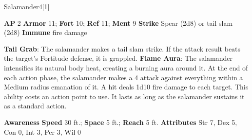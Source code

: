 \begin{monsection}[Flamebrother]{Salamander}{4}[1]
\vspace{-1em}\vspace{-1em}
\begin{spellcontent}
\begin{spelltargetinginfo}
{\textbf{AP} 2}
\pari \textbf{Armor} 11;
\textbf{Fort} 10;
\textbf{Ref} 11;
\textbf{Ment} 9
\pari \textbf{Strike} Spear  (2d8) or tail slam  (2d8)
\pari \textbf{Immune} fire damage
\end{spelltargetinginfo}
\begin{spelleffects}
\pari
\textbf{Tail Grab}:
The salamander makes a tail slam strike.
If the attack result beats the target's Fortitude defense, it is grappled.
\vspace{0.5em}
\pari
\textbf{Flame Aura}:
The salamander intensifies its natural body heat, creating a burning aura around it.
At the end of each action phase, the salamander makes a 4 attack
against everything within a Medium radius emanation of it.
A hit deals 1d10 fire damage to each target.
This ability costs an action point to use.
It lasts as long as the salamander sustains it as a standard action.
\end{spelleffects}
\end{spellcontent}
\begin{spellsubcontent}
\begin{spellfooter}
\pari \textbf{Awareness} 
\pari \textbf{Speed} 30 ft.;
\textbf{Space} 5 ft.;
\textbf{Reach} 5 ft.
\pari \textbf{Attributes}
Str 7,
Dex 5,
Con 0,
Int 3,
Per 3,
Wil 0
\end{spellfooter}
\end{spellsubcontent}
\end{monsection}
